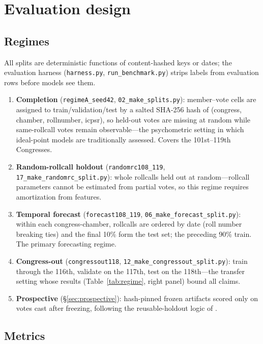 \documentclass[11pt]{article}
\newcommand{\code}[1]{\texttt{#1}}
\begin{document}
\section{Evaluation design}
\label{sec:eval}

\subsection{Regimes}
\label{sec:regimes}

All splits are deterministic functions of content-hashed keys or dates;
the evaluation harness (\code{harness.py}, \code{run\_benchmark.py})
strips labels from evaluation rows before models see them.

\begin{enumerate}
\item \textbf{Completion} (\code{regimeA\_seed42},
\code{02\_make\_splits.py}): member--vote cells are assigned to
train/validation/test by a salted SHA-256 hash of (congress, chamber,
rollnumber, icpsr), so held-out votes are missing at random while
same-rollcall votes remain observable---the psychometric setting in
which ideal-point models are traditionally assessed. Covers the
101st--119th Congresses.
\item \textbf{Random-rollcall holdout} (\code{randomrc108\_119},
\code{17\_make\_randomrc\_split.py}): whole rollcalls held out at
random---rollcall parameters cannot be estimated from partial votes, so
this regime requires amortization from features.
\item \textbf{Temporal forecast} (\code{forecast108\_119},
\code{06\_make\_forecast\_split.py}): within each congress-chamber,
rollcalls are ordered by date (roll number breaking ties) and the final
10\% form the test set; the preceding 90\% train. The primary
forecasting regime.
\item \textbf{Congress-out} (\code{congressout118},
\code{12\_make\_congressout\_split.py}): train through the 116th,
validate on the 117th, test on the 118th---the transfer setting whose
results (Table~\ref{tab:regime}, right panel) bound all claims.
\item \textbf{Prospective} (\S\ref{sec:prospective}): hash-pinned
frozen artifacts scored only on votes cast after freezing, following
the reusable-holdout logic of \citet{dwork2015holdout}.
\end{enumerate}

\subsection{Metrics}
\end{document}
